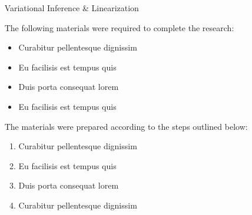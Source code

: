 \documentclass[final]{beamer}
\newlength{\sepwid}
\newlength{\onecolwid}
\newlength{\twocolwid}
\begin{document}
\begin{frame}[t]
\begin{columns}[t]
\begin{column}{\onecolwid}

\end{column} %

\begin{column}{\sepwid}\end{column} %

\begin{column}{\twocolwid} %

\begin{columns}[t,totalwidth=\twocolwid] %

\begin{column}{\onecolwid}\vspace{-.6in} %


\begin{block}{Variational Inference \& Linearization}

The following materials were required to complete the research:

\begin{itemize}
\item Curabitur pellentesque dignissim
\item Eu facilisis est tempus quis
\item Duis porta consequat lorem
\item Eu facilisis est tempus quis
\end{itemize}

The materials were prepared according to the steps outlined below:

\begin{enumerate}
\item Curabitur pellentesque dignissim
\item Eu facilisis est tempus quis
\item Duis porta consequat lorem
\item Curabitur pellentesque dignissim
\end{enumerate}

\end{block}



\end{column}
\end{columns}
\end{column}
\end{columns}
\end{frame}
\end{document}
